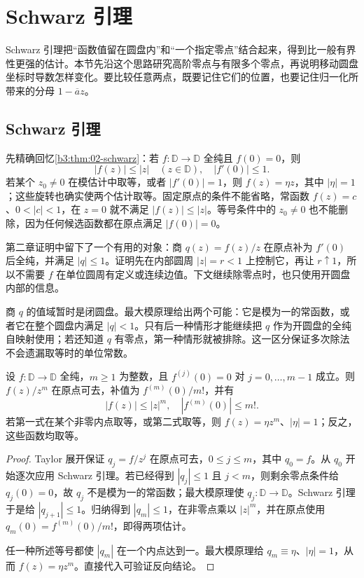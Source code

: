 \section{Schwarz 引理}
\label{b3:sec:0601}

Schwarz 引理把“函数值留在圆盘内”和“一个指定零点”结合起来，得到比一般有界性更强的估计。本节先沿这个思路研究高阶零点与有限多个零点，再说明移动圆盘坐标时导数怎样变化。要比较任意两点，既要记住它们的位置，也要记住归一化所带来的分母 \(1-\overline a z\)。

\subsection{Schwarz 引理}
\label{b3:subsec:060101}

先精确回忆\cref{b3:thm:02-schwarz}：若 \(f:\mathbb D\to\mathbb D\) 全纯且 \(f(0)=0\)，则
\[
 |f(z)|\le|z|\quad(z\in\mathbb D),\quad |f'(0)|\le1.
\]
若某个 \(z_0\ne0\) 在模估计中取等，或者 \(|f'(0)|=1\)，则 \(f(z)=\eta z\)，其中 \(|\eta|=1\)；这些旋转也确实使两个估计取等。固定原点的条件不能省略，常函数 \(f(z)=c\)、\(0<|c|<1\)，在 \(z=0\) 就不满足 \(|f(z)|\le|z|\)。等号条件中的 \(z_0\ne0\) 也不能删除，因为任何候选函数都在原点满足 \(|f(0)|=0\)。

\ProseParagraphBreak

第二章证明中留下了一个有用的对象：商 \(q(z)=f(z)/z\) 在原点补为 \(f'(0)\) 后全纯，并满足 \(|q|\le1\)。证明先在内部圆周 \(|z|=r<1\) 上控制它，再让 \(r\uparrow1\)，所以不需要 \(f\) 在单位圆周有定义或连续边值。下文继续除零点时，也只使用开圆盘内部的信息。

\ProseParagraphBreak

商 \(q\) 的值域暂时是闭圆盘。最大模原理给出两个可能：它是模为一的常函数，或者它在整个圆盘内满足 \(|q|<1\)。只有后一种情形才能继续把 \(q\) 作为开圆盘的全纯自映射使用；若还知道 \(q\) 有零点，第一种情形就被排除。这一区分保证多次除法不会遗漏取等时的单位常数。

\begin{proposition}\label{b3:prop:06-higher-order-schwarz}
设 \(f:\mathbb D\to\mathbb D\) 全纯，\(m\ge1\) 为整数，且 \(f^{(j)}(0)=0\) 对 \(j=0,\ldots,m-1\) 成立。则 \(f(z)/z^m\) 在原点可去，补值为 \(f^{(m)}(0)/m!\)，并有
\[
 |f(z)|\le|z|^m,\quad |f^{(m)}(0)|\le m!.
\]
若第一式在某个非零内点取等，或第二式取等，则 \(f(z)=\eta z^m\)、\(|\eta|=1\)；反之，这些函数均取等。
\end{proposition}
\begin{proof}
Taylor 展开保证 \(q_j=f/z^j\) 在原点可去，\(0\le j\le m\)，其中 \(q_0=f\)。从 \(q_0\) 开始逐次应用 Schwarz 引理。若已经得到 \(|q_j|\le1\) 且 \(j<m\)，则剩余零点条件给 \(q_j(0)=0\)，故 \(q_j\) 不是模为一的常函数；最大模原理使 \(q_j:\mathbb D\to\mathbb D\)。Schwarz 引理于是给 \(|q_{j+1}|\le1\)。归纳得到 \(|q_m|\le1\)，在非零点乘以 \(|z|^m\)，并在原点使用 \(q_m(0)=f^{(m)}(0)/m!\)，即得两项估计。

任一种所述等号都使 \(|q_m|\) 在一个内点达到一。最大模原理给 \(q_m\equiv\eta\)、\(|\eta|=1\)，从而 \(f(z)=\eta z^m\)。直接代入可验证反向结论。
\end{proof}

